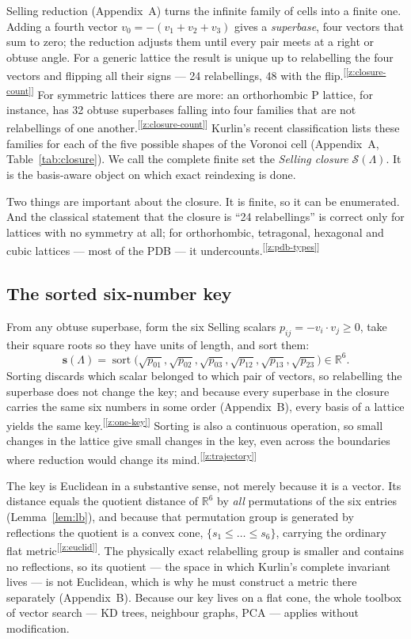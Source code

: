 \documentclass[11pt]{article}
\newcommand{\sortkey}{\mathbf{s}}
\newcommand{\Sclosure}{\mathcal{S}}
\newcommand{\chk}[1]{\textsuperscript{[\ref{#1}]}}
\begin{document}
Selling reduction (Appendix~A) turns the infinite family of cells into a finite one. Adding a fourth vector $v_0=-(v_1+v_2+v_3)$ gives a \emph{superbase}, four vectors that sum to zero; the reduction adjusts them until every pair meets at a right or obtuse angle. For a generic lattice the result is unique up to relabelling the four vectors and flipping all their signs --- 24 relabellings, 48 with the flip.\chk{z:closure-count} For symmetric lattices there are more: an orthorhombic P lattice, for instance, has 32 obtuse superbases falling into four families that are not relabellings of one another.\chk{z:closure-count} Kurlin's recent classification lists these families for each of the five possible shapes of the Voronoi cell (Appendix~A, Table~\ref{tab:closure}). We call the complete finite set the \emph{Selling closure} $\Sclosure(\Lambda)$. It is the basis-aware object on which exact reindexing is done.

Two things are important about the closure. It is finite, so it can be enumerated. And the classical statement that the closure is ``24 relabellings'' is correct only for lattices with no symmetry at all; for orthorhombic, tetragonal, hexagonal and cubic lattices --- most of the PDB --- it undercounts.\chk{z:pdb-types}

\subsection{The sorted six-number key}

From any obtuse superbase, form the six Selling scalars $p_{ij}=-v_i\cdot v_j\ge0$, take their square roots so they have units of length, and sort them:
\[
\sortkey(\Lambda)=\operatorname{sort}\big(\sqrt{p_{01}},\sqrt{p_{02}},\sqrt{p_{03}},\sqrt{p_{12}},\sqrt{p_{13}},\sqrt{p_{23}}\big)\in\mathbb R^6 .
\]
Sorting discards which scalar belonged to which pair of vectors, so relabelling the superbase does not change the key; and because every superbase in the closure carries the same six numbers in some order (Appendix~B), every basis of a lattice yields the same key.\chk{z:one-key} Sorting is also a continuous operation, so small changes in the lattice give small changes in the key, even across the boundaries where reduction would change its mind.\chk{z:trajectory}

The key is Euclidean in a substantive sense, not merely because it is a vector. Its distance equals the quotient distance of $\mathbb R^6$ by \emph{all} permutations of the six entries (Lemma~\ref{lem:lb}), and because that permutation group is generated by reflections the quotient is a convex cone, $\{s_1\le\dots\le s_6\}$, carrying the ordinary flat metric\chk{z:euclid}. The physically exact relabelling group is smaller and contains no reflections, so its quotient --- the space in which Kurlin's complete invariant lives --- is not Euclidean, which is why he must construct a metric there separately (Appendix~B). Because our key lives on a flat cone, the whole toolbox of vector search --- KD trees, neighbour graphs, PCA --- applies without modification.
\end{document}
